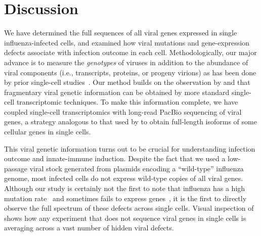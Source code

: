\documentclass[9pt,lineno]{template}
\begin{document}
\section{Discussion}
We have determined the full sequences of all viral genes expressed in single influenza-infected cells, and examined how viral mutations and gene-expression defects associate with infection outcome in each cell.
Methodologically, our major advance is to measure the \emph{genotypes} of viruses in addition to the abundance of viral components (i.e., transcripts, proteins, or progeny virions) as has been done by prior single-cell studies~\citep{russell2018extreme, zanini2018single, zanini2018virus, steuerman2018dissection, saikia2018simultaneous, oneal2018west, zhu2009growth, schulte2014single, akpinar2016high, heldt2015single, brooke2013most}.
Our method builds on the observation by \citet{saikia2018simultaneous} and \citet{zanini2018virus} that fragmentary viral genetic information can be obtained by more standard single-cell transcriptomic techniques.
To make this information complete, we have coupled single-cell transcriptomics with long-read PacBio sequencing of viral genes, a strategy analogous to that used by \cite{gupta2018single} to obtain full-length isoforms of some cellular genes in single cells.

This viral genetic information turns out to be crucial for understanding infection outcome and innate-immune induction.
Despite the fact that we used a low-passage viral stock generated from plasmids encoding a ``wild-type'' influenza genome, most infected cells do not express wild-type copies of all viral genes.
Although our study is certainly not the first to note that influenza has a high mutation rate~\citep{parvin1986measurement, suarez1992heterogeneity, suarez1994estimation, bloom2014experimentally, pauly2017novel} and sometimes fails to express genes~\citep{brooke2013most, heldt2015single, dou2017analysis, russell2018extreme}, it is the first to directly observe the full spectrum of these defects across single cells.
Visual inspection of  shows how any experiment that does not sequence viral genes in single cells is averaging across a vast number of hidden viral defects.
\end{document}
